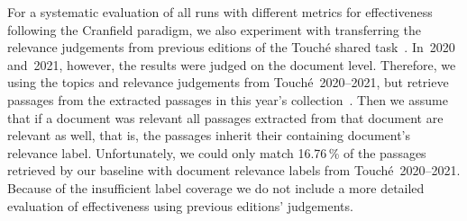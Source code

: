 For a systematic evaluation of all runs with different metrics for effectiveness following the Cranfield paradigm, we also experiment with transferring the relevance judgements from previous editions of the Touché shared task~\cite{BondarenkoFBGAPBSWPH2020,BondarenkoGFBAPBSWPH2021}.
In~2020 and~2021, however, the results were judged on the document level.
Therefore, we using the topics and relevance judgements from Touché~2020--2021, but retrieve passages from the extracted passages in this year's collection~\cite{BondarenkoFKSGBPBSWPH2022}.
Then we assume that if a document was relevant all passages extracted from that document are relevant as well, that is, the passages inherit their containing document's relevance label.
Unfortunately, we could only match 16.76\,\% of the passages retrieved by our baseline with document relevance labels from Touché~2020--2021.
Because of the insufficient label coverage we do not include a more detailed evaluation of effectiveness using previous editions' judgements.
